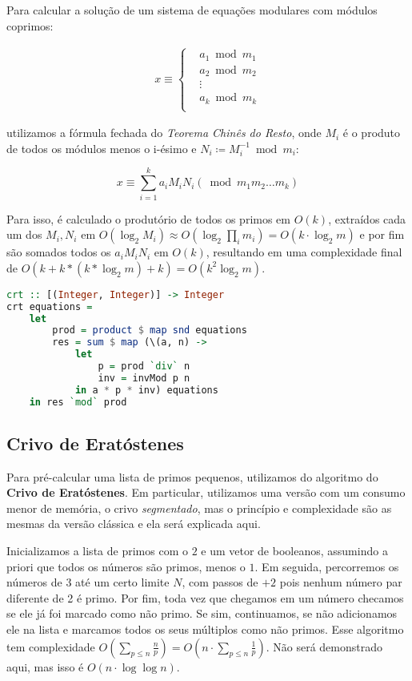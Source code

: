 \documentclass{article}
\begin{document}
Para calcular a solução de um sistema de equações modulares com módulos coprimos:

\begin{align*}
  x \equiv \begin{cases}
    &a_1 \bmod m_1 \\
    &a_2 \bmod m_2 \\
    &\vdots \\
    &a_k \bmod m_k \\
\end{cases}
\end{align*}

utilizamos a fórmula fechada do \textit{Teorema Chinês do Resto}, onde $M_i$ é o produto de todos os módulos menos o i-ésimo e $N_i \coloneq M_i^{-1} \bmod m_i$:

\[
  x \equiv \sum_{i=1}^{k} a_iM_iN_i (\bmod m_1m_2 \ldots m_k)
\]

Para isso, é calculado o produtório de todos os primos em $O(k)$, extraídos cada um dos $M_i, N_i$ em $O(\log_2 M_i) \approx O(\log_2 \prod_i m_i) = O(k \cdot \log_2 m)$ e por fim são somados todos os $a_iM_iN_i$ em $O(k)$, resultando em uma complexidade final de $O(k + k*(k* \log_2 m) + k) = O(k^2 \log_2 m)$.

\begin{minipage}{.9\linewidth}
\begin{lstlisting}[language=haskell,caption=Teorema Chinês do Resto]
crt :: [(Integer, Integer)] -> Integer
crt equations =
    let
        prod = product $ map snd equations
        res = sum $ map (\(a, n) ->
            let
                p = prod `div` n
                inv = invMod p n
            in a * p * inv) equations
    in res `mod` prod
\end{lstlisting}
\end{minipage}

\subsection{Crivo de Eratóstenes}

Para pré-calcular uma lista de primos pequenos, utilizamos do algoritmo do \textbf{Crivo de Eratóstenes}. Em particular, utilizamos uma versão com um consumo menor de memória, o crivo \textit{segmentado}, mas o princípio e complexidade são as mesmas da versão clássica e ela será explicada aqui.

Inicializamos a lista de primos com o $2$ e um vetor de booleanos, assumindo a priori que todos os números são primos, menos o $1$. Em seguida, percorremos os números de $3$ até um certo limite $N$, com passos de $+2$ pois nenhum número par diferente de 2 é primo. Por fim, toda vez que chegamos em um número checamos se ele já foi marcado como não primo. Se sim, continuamos, se não adicionamos ele na lista e marcamos todos os seus múltiplos como não primos. Esse algoritmo tem complexidade $O(\sum_{p \leq n} \frac{n}{p}) = O(n \cdot \sum_{p \leq n}\frac{1}{p})$. Não será demonstrado aqui, mas isso é $O(n \cdot \log \log n)$.
\end{document}
